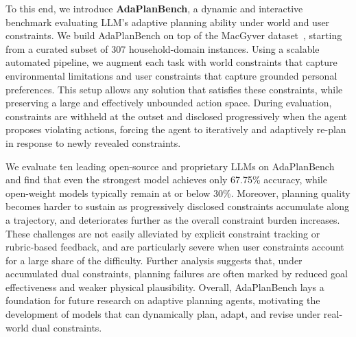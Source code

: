 \documentclass{llmxive}
\providecommand{\BENCH}[1]{\textbf{AdaPlanBench}}
\providecommand{\bench}[1]{AdaPlanBench}
\begin{document}
To this end, we introduce \BENCH{}, a dynamic and interactive benchmark evaluating LLM's adaptive planning ability under world and user constraints. 
We build \bench{} on top of the MacGyver dataset~\citep{MacGyver}, starting from a curated subset of 307 household-domain instances.
Using a scalable automated pipeline, we augment each task with world constraints that capture environmental limitations and user constraints that capture grounded personal preferences.
This setup allows any solution that satisfies these constraints, while preserving a large and effectively unbounded action space.
During evaluation, constraints are withheld at the outset and disclosed progressively when the agent proposes violating actions, forcing the agent to iteratively and adaptively re-plan in response to newly revealed constraints.

We evaluate ten leading open-source and proprietary LLMs on \bench{} and find that even the strongest model achieves only 67.75\% accuracy, while open-weight models typically remain at or below 30\%.
Moreover, planning quality becomes harder to sustain as progressively disclosed constraints accumulate along a trajectory, and deteriorates further as the overall constraint burden increases.
These challenges are not easily alleviated by explicit constraint tracking or rubric-based feedback, and are particularly severe when user constraints account for a large share of the difficulty.
Further analysis suggests that, under accumulated dual constraints, planning failures are often marked by reduced goal effectiveness and weaker physical plausibility.
Overall, \bench{} lays a foundation for future research on adaptive planning agents, motivating the development of models that can dynamically plan, adapt, and revise under real-world dual constraints.



\end{document}

